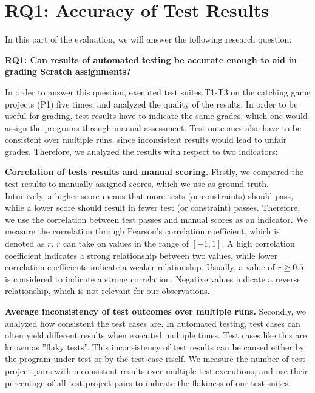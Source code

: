 \section{RQ1: Accuracy of Test Results}
\label{sec:rq1}

In this part of the evaluation, we will answer the following research question:

\begin{center}\begin{minipage}{.9\textwidth}
    \textbf{RQ1: Can results of automated testing be accurate enough to aid in grading Scratch assignments?}
\end{minipage}\end{center}

\noindent In order to answer this question,
executed test suites T1-T3 on the catching game projects (P1) five times,
and analyzed the quality of the results.
In order to be useful for grading,
test results have to indicate the same grades,
which one would assign the programs through manual assessment.
Test outcomes also have to be consistent over multiple runs,
since inconsistent results would lead to unfair grades.
Therefore, we analyzed the results with respect to two indicators:
\parspace

\textbf{Correlation of tests results and manual scoring.}
Firstly, we compared the test results to manually assigned scores, which we use as ground truth.
Intuitively, a higher score means that more tests (or constraints) should pass,
while a lower score should result in fewer test (or constraint) passes.
Therefore, we use the correlation between test passes and manual scores as an indicator.
We measure the correlation through Pearson's correlation coefficient, which is denoted as $r$.
$r$ can take on values in the range of $[-1, 1]$.
A high correlation coefficient indicates a strong relationship between two values,
while lower correlation coefficients indicate a weaker relationship.
Usually, a value of $r \ge 0.5$ is considered to indicate a strong correlation.
Negative values indicate a reverse relationship, which is not relevant for our observations.
\parspace

\textbf{Average inconsistency of test outcomes over multiple runs.}
Secondly, we analyzed how consistent the test cases are.
In automated testing, test cases can often yield different results when executed multiple times.
Test cases like this are known as ''flaky tests''.
This inconsistency of test results can be caused either by the program under test or by the test case itself.
We measure the number of test-project pairs with inconsistent results over multiple test executions,
and use their percentage of all test-project pairs to indicate the flakiness of our test suites.

